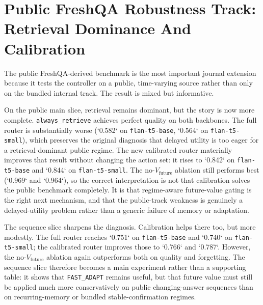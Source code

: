 \section{Public FreshQA Robustness Track: Retrieval Dominance And Calibration}

The public FreshQA-derived benchmark is the most important journal extension because it tests the controller on a public, time-varying source rather than only on the bundled internal track. The result is mixed but informative.

\begin{table}[h]
\centering
\small

\caption{Public FreshQA-derived main slice from \texttt{artifacts/journal\_freshqa\_main\_calibrated\_v1/aggregate\_table.md}.}
\label{tab:j-fresh-main}
\end{table}

On the public main slice, retrieval remains dominant, but the story is now more complete. \texttt{always\_retrieve} achieves perfect quality on both backbones. The full router is substantially worse (`0.582` on \texttt{flan-t5-base}, `0.564` on \texttt{flan-t5-small}), which preserves the original diagnosis that delayed utility is too eager for a retrieval-dominant public regime. The new calibrated router materially improves that result without changing the action set: it rises to `0.842` on \texttt{flan-t5-base} and `0.844` on \texttt{flan-t5-small}. The no-$V_{\text{future}}$ ablation still performs best (`0.969` and `0.964`), so the correct interpretation is not that calibration solves the public benchmark completely. It is that regime-aware future-value gating is the right next mechanism, and that the public-track weakness is genuinely a delayed-utility problem rather than a generic failure of memory or adaptation.

\begin{table}[h]
\centering
\small

\caption{Public FreshQA-derived sequence slice from \texttt{artifacts/journal\_freshqa\_sequence\_calibrated\_v1/aggregate\_table.md}.}
\label{tab:j-fresh-seq}
\end{table}

The sequence slice sharpens the diagnosis. Calibration helps there too, but more modestly. The full router reaches `0.751` on \texttt{flan-t5-base} and `0.740` on \texttt{flan-t5-small}; the calibrated router improves those to `0.766` and `0.787`. However, the no-$V_{\text{future}}$ ablation again outperforms both on quality and forgetting. The sequence slice therefore becomes a main experiment rather than a supporting table: it shows that \texttt{FAST\_ADAPT} remains useful, but that future value must still be applied much more conservatively on public changing-answer sequences than on recurring-memory or bundled stable-confirmation regimes.

